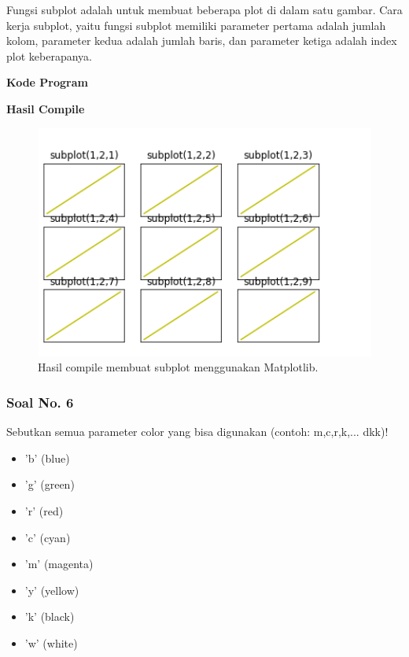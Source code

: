 \hfill \break
Fungsi subplot adalah untuk membuat beberapa plot di dalam satu gambar.
\hfill \break
Cara kerja subplot, yaitu fungsi subplot memiliki parameter pertama adalah jumlah kolom, parameter kedua adalah jumlah baris, dan parameter ketiga adalah index plot keberapanya.

\hfill \break
\textbf{Kode Program}



\hfill \break
\textbf{Hasil Compile}

\begin{figure}[H]
	\includegraphics[width=12cm]{figures/6/1174026/5.png}
	\centering
	\caption{Hasil compile membuat subplot menggunakan Matplotlib.}
\end{figure}

\subsubsection{Soal No. 6}
\hfill \break
Sebutkan semua parameter color yang bisa digunakan (contoh:  m,c,r,k,...  dkk)!

\begin{itemize}
	\item 'b' (blue)
	\item 'g' (green)
	\item 'r' (red)
	\item 'c' (cyan)
	\item 'm' (magenta)
	\item 'y' (yellow)
	\item 'k' (black)
	\item 'w' (white)
\end{itemize}


